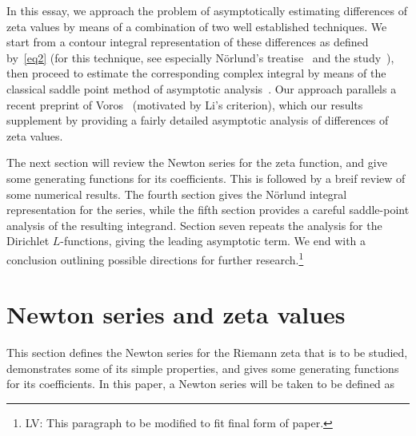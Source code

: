 \documentclass{amsart}
\begin{document}
In this essay,  we  approach the problem of  asymptotically estimating
differences of  zeta  values by means of   a combination  of  two well
established   techniques.   We   start   from   a   contour   integral
representation of these  differences as defined by~\eqref{eq2}  (for this
technique, see   especially N\"orlund's treatise~\cite{Norlund54}  and
the study~\cite{FlSe95}),  then proceed to estimate the corresponding
complex  integral by  means of the classical  saddle point method of asymptotic
analysis~\cite{deBruijn81,Olver74}. Our approach parallels a recent  preprint
of Voros~\cite{Voros05} (motivated by Li's criterion), 
which our results supplement by providing a fairly 
detailed asymptotic analysis of differences of zeta values.

The next section will review the Newton series for the zeta function,
and give some generating functions for its coefficients. This is followed
by a breif review of some numerical results. The fourth section
gives the N\"orlund integral representation for the series,
while the fifth section provides a careful saddle-point analysis 
of the resulting integrand.  Section seven repeats the analysis
for the Dirichlet $L$-functions, giving the leading asymptotic
term.  We end with a conclusion outlining possible directions
for further research.\footnote{%
  LV: This paragraph to be modified to fit final form of paper.}



\section{Newton series and zeta values}


This section defines the Newton series for the Riemann zeta
that is to be studied, demonstrates some of its simple properties,
and gives some generating functions for its coefficients.
In this paper, a Newton series will be taken to be defined as
\end{document}
